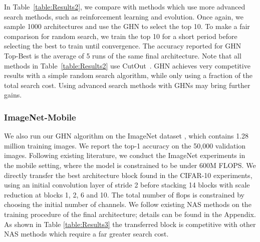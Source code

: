 In Table~\ref{table:Results2}, we compare with methods which use more advanced search methods, such
as reinforcement learning and evolution. Once again, we sample 1000 architectures and use the GHN to
select the top 10. To make a fair comparison for random search, we train the top 10 for a short
period before selecting the best to train until convergence. The accuracy reported for GHN Top-Best
is the average of 5 runs  of the same final architecture. Note that all methods in
Table~\ref{table:Results2} use CutOut~\citep{devriescutout17}. GHN achieves very competitive results
with a simple random search algorithm, while only using a fraction of the total search cost. Using
advanced search methods with GHNs may bring further gains.

\subsubsection{ImageNet-Mobile}
We also run our GHN algorithm on the ImageNet dataset \citep{russakovsky2015imagenet}, which
contains 1.28 million training images. We report the top-1  accuracy on the 50,000 validation
images. Following existing literature, we conduct the ImageNet experiments in the mobile setting,
where the model is constrained to be under 600M FLOPS. We directly transfer the best architecture
block found in the CIFAR-10 experiments, using an initial convolution layer of stride 2 before
stacking 14 blocks with scale reduction at blocks 1, 2, 6 and 10. The total number of flops is
constrained by choosing the initial number of channels. We follow existing NAS methods on the
training procedure of the final architecture; details can be found in the Appendix. As shown in
Table \ref{table:Results3} the transferred block is competitive with other NAS methods which require
a far greater search cost.